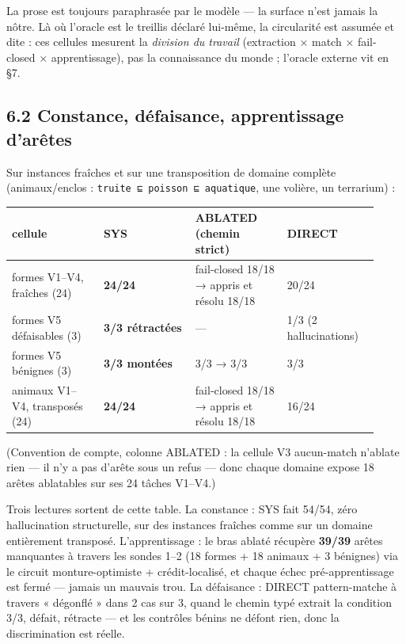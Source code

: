 \documentclass[11pt]{article}
\begin{document}
La prose est toujours paraphrasée par le modèle — la surface n'est jamais la nôtre. Là où l'oracle est le treillis déclaré lui-même, la circularité est assumée et dite : ces cellules mesurent la \emph{division du travail} (extraction × match × fail-closed × apprentissage), pas la connaissance du monde ; l'oracle externe vit en §7.

\subsection*{6.2 Constance, défaisance, apprentissage d'arêtes}

Sur instances fraîches et sur une transposition de domaine complète (animaux/enclos : \texttt{truite ⊑ poisson ⊑ aquatique}, une volière, un terrarium) :

\begin{center}\small\begin{tabular}{p{0.23\linewidth}p{0.23\linewidth}p{0.23\linewidth}p{0.23\linewidth}}\toprule
cellule & SYS & ABLATED (chemin strict) & DIRECT \\ \midrule
formes V1–V4, fraîches (24) & \textbf{24/24} & fail-closed 18/18 → appris et résolu 18/18 & 20/24 \\
formes V5 défaisables (3) & \textbf{3/3 rétractées} & — & 1/3 (2 hallucinations) \\
formes V5 bénignes (3) & \textbf{3/3 montées} & 3/3 → 3/3 & 3/3 \\
animaux V1–V4, transposés (24) & \textbf{24/24} & fail-closed 18/18 → appris et résolu 18/18 & 16/24 \\
\bottomrule\end{tabular}\end{center}

(Convention de compte, colonne ABLATED : la cellule V3 aucun-match n'ablate rien — il n'y a pas d'arête sous un refus — donc chaque domaine expose 18 arêtes ablatables sur ses 24 tâches V1–V4.)

Trois lectures sortent de cette table. La constance : SYS fait 54/54, zéro hallucination structurelle, sur des instances fraîches comme sur un domaine entièrement transposé. L'apprentissage : le bras ablaté récupère \textbf{39/39} arêtes manquantes à travers les sondes 1–2 (18 formes + 18 animaux + 3 bénignes) via le circuit monture-optimiste + crédit-localisé, et chaque échec pré-apprentissage est fermé — jamais un mauvais trou. La défaisance : DIRECT pattern-matche à travers « dégonflé » dans 2 cas sur 3, quand le chemin typé extrait la condition 3/3, défait, rétracte — et les contrôles bénins ne défont rien, donc la discrimination est réelle.
\end{document}
